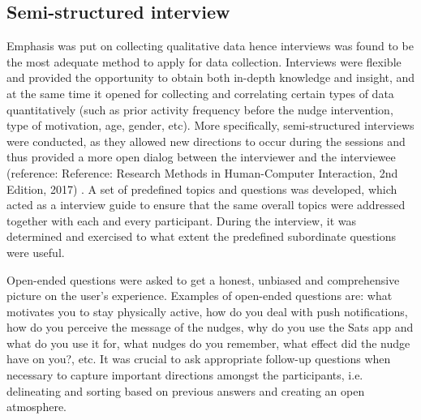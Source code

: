     \subsection{Semi-structured interview}
    Emphasis was put on collecting qualitative data hence interviews was found to be the most adequate method to apply for data collection. Interviews were flexible and provided the opportunity to obtain both in-depth knowledge and insight, and at the same time it opened for collecting and correlating certain types of data quantitatively (such as prior activity frequency before the nudge intervention,  type of motivation, age, gender, etc). More specifically, semi-structured interviews were conducted, as they allowed new directions to occur during the sessions and thus provided a more open dialog between the interviewer and the interviewee \cite{karl_chapter_nodate}(reference: Reference: Research Methods in Human-Computer Interaction, 2nd Edition, 2017) . A set of predefined topics and questions was developed, which acted as a interview guide to ensure that the same overall topics were addressed together with each and every participant. During the interview, it was determined and exercised to what extent the predefined subordinate questions were useful. 

    Open-ended questions were asked to get a honest, unbiased and comprehensive picture on the user’s experience. Examples of open-ended questions are: what motivates you to stay physically active, how do you deal with push notifications, how do you perceive the message of the nudges, why do you use the Sats app and what do you use it for, what nudges do you remember, what effect did the nudge have on you?, etc. It was crucial to ask appropriate follow-up questions when necessary to capture important directions amongst the participants, i.e. delineating and sorting based on previous answers and creating an open atmosphere.
  
